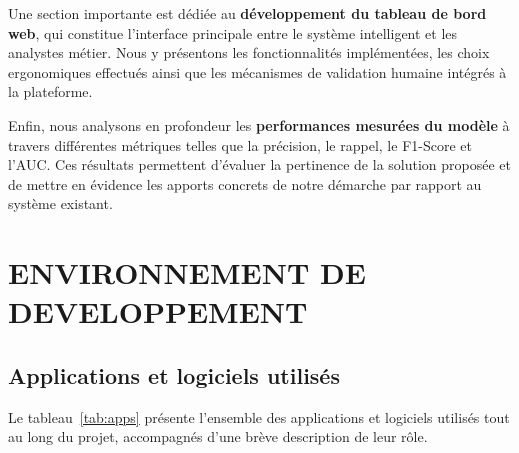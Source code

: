 \documentclass[12pt, oneside, a4paper]{report}
\begin{document}
Une section importante est dédiée au \textbf{développement du tableau de bord web}, qui constitue l'interface principale entre le système intelligent et les analystes métier. Nous y présentons les fonctionnalités implémentées, les choix ergonomiques effectués ainsi que les mécanismes de validation humaine intégrés à la plateforme.

Enfin, nous analysons en profondeur les \textbf{performances mesurées du modèle} à travers différentes métriques telles que la précision, le rappel, le F1-Score et l'AUC. Ces résultats permettent d'évaluer la pertinence de la solution proposée et de mettre en évidence les apports concrets de notre démarche par rapport au système existant.


\section{ENVIRONNEMENT DE DEVELOPPEMENT}

\subsection{Applications et logiciels utilisés}
Le tableau~\ref{tab:apps} présente l'ensemble des applications et logiciels utilisés tout au long du projet, accompagnés d'une brève description de leur rôle.
\end{document}
